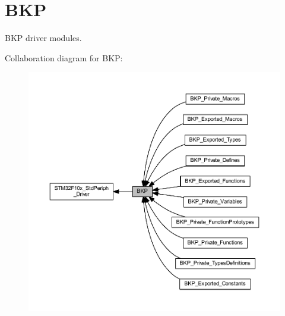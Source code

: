 \hypertarget{group___b_k_p}{}\section{B\+KP}
\label{group___b_k_p}


B\+KP driver modules.  


Collaboration diagram for B\+KP\+:
\nopagebreak
\begin{figure}[H]
\begin{center}
\leavevmode
\includegraphics[width=350pt]{group___b_k_p}
\end{center}
\end{figure}
